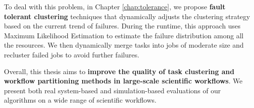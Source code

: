 To deal with this problem, in Chapter \ref{chap:tolerance}, we propose \textbf{fault tolerant clustering} techniques that dynamically adjusts the clustering strategy based on the current trend of failures. During the runtime, this approach uses Maximum Likelihood Estimation to estimate the failure distribution among all the resources. We then dynamically merge tasks into jobs of moderate size and recluster failed jobs to avoid further failures.




Overall, this thesis aims to \textbf{improve the quality of task clustering and workflow partitioning methods in large-scale scientific workflows}. We present both real system-based and simulation-based evaluations of our algorithms on a wide range of scientific workflows. 






